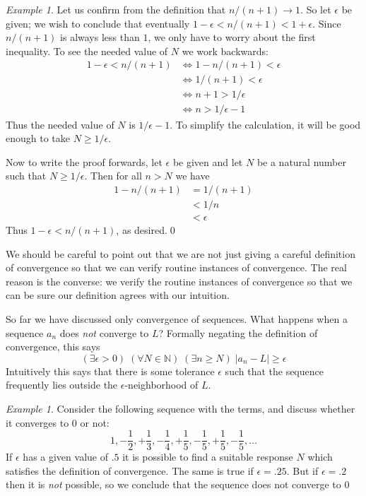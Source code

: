\documentclass[11pt,oneside]{amsbook}
\newcommand{\N}{\mathbb N}
\theoremstyle{definition}
\theoremstyle{plain}
\theoremstyle{definition}
\theoremstyle{remark}
\newtheorem{example}[thm]{Example}
\numberwithin{equation}{section}
\numberwithin{figure}{section}
\begin{document}
\begin{example}
  Let us confirm from the definition that $n/(n+1)\to1$. So let $\epsilon$ be given; we wish to conclude that eventually $1-\epsilon<n/(n+1)<1+\epsilon$. Since $n/(n+1)$ is always less than $1$, we only have to worry about the first inequality. To see the needed value of $N$ we work backwards:
  \begin{align*}
    1-\epsilon<n/(n+1)&\iff 1-n/(n+1)<\epsilon \\
                      &\iff 1/(n+1)<\epsilon \\
                      &\iff n+1>1/\epsilon \\
                      &\iff n>1/\epsilon-1
  \end{align*}
  Thus the needed value of $N$ is $1/\epsilon-1$. To simplify the calculation, it will be good enough to take $N\geq 1/\epsilon$.
  
  Now to write the proof forwards, let $\epsilon$ be given and let $N$ be a natural number such that $N\geq 1/\epsilon$. Then for all $n>N$ we have
  \begin{align*}
    1-n/(n+1) &= 1/(n+1)\\
              &< 1/n\\
              &<\epsilon
  \end{align*}
  Thus $1-\epsilon < n/(n+1)$, as desired.\qed
\end{example}

We should be careful to point out that we are not just giving a careful definition of convergence so that we can verify routine instances of convergence. The real reason is the converse: we verify the routine instances of convergence so that we can be sure our definition agrees with our intuition.


So far we have discussed only convergence of sequences. What happens when a sequence $a_n$ does \emph{not} converge to $L$? Formally negating the definition of convergence, this says
\[(\exists\epsilon>0)\;(\forall N\in\N)\;(\exists n\geq N)\;|a_n-L|\geq\epsilon
\]
Intuitively this says that there is some tolerance $\epsilon$ such that the sequence frequently lies outside the $\epsilon$-neighborhood of $L$.

\begin{example}
  Consider the following sequence with the terms, and discuss whether it converges to $0$ or not:
  \[1,-\frac12,+\frac13,-\frac14,+\frac15,-\frac15,+\frac15,-\frac15,\ldots
  \]
  If $\epsilon$ has a given value of $.5$ it is possible to find a suitable response $N$ which satisfies the definition of convergence. The same is true if $\epsilon=.25$. But if $\epsilon=.2$ then it is \emph{not} possible, so we conclude that the sequence does not converge to $0$
\end{example}
\end{document}
